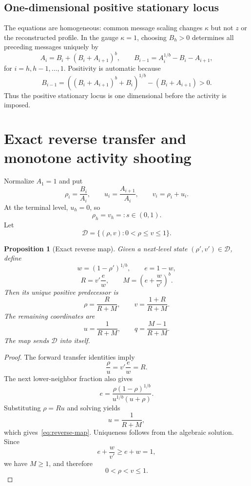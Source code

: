 \documentclass[11pt]{amsart}
\newtheorem{proposition}[theorem]{Proposition}
\theoremstyle{definition}
\newcommand{\Dcal}{\mathcal D}
\begin{document}
\subsection{One-dimensional positive stationary locus}
The equations are homogeneous: common message scaling changes $\kappa$ but not $z$ or the reconstructed profile.  In the gauge $\kappa=1$, choosing $B_h>0$ determines all preceding messages uniquely by
\begin{equation}\label{eq:message-backward}
 A_i=B_i+(B_i+A_{i+1})^b,
 \qquad
 B_{i-1}=A_i^{1/b}-B_i-A_{i+1},
\end{equation}
for $i=h,h-1,\ldots,1$.  Positivity is automatic because
\[
 B_{i-1}=\left((B_i+A_{i+1})^b+B_i\right)^{1/b}-(B_i+A_{i+1})>0.
\]
Thus the positive stationary locus is one dimensional before the activity is imposed.


\section{Exact reverse transfer and monotone activity shooting}
Normalize $A_1=1$ and put
\[
 \rho_i=\frac{B_i}{A_i},
 \qquad
 u_i=\frac{A_{i+1}}{A_i},
 \qquad
 v_i=\rho_i+u_i.
\]
At the terminal level, $u_h=0$, so
\[
 \rho_h=v_h=:s\in(0,1).
\]
Let
\[
 \Dcal=\{(\rho,v):0<\rho\le v\le1\}.
\]

\begin{proposition}[Exact reverse map]\label{prop:reverse-map}
Given a next-level state $(\rho',v')\in\Dcal$, define
\[
 w=(1-\rho')^{1/b},
 \qquad
 e=1-w,
\]
\[
 R=v'\frac ew,
 \qquad
 M=\left(e+\frac w{v'}\right)^b.
\]
Then its unique positive predecessor is
\begin{equation}\label{eq:reverse-map}
 \boxed{
 \rho=\frac{R}{R+M},
 \qquad
 v=\frac{1+R}{R+M}.
 }
\end{equation}
The remaining coordinates are
\begin{equation}\label{eq:reverse-out}
 u=\frac1{R+M},\qquad q=\frac{M-1}{R+M}.
\end{equation}
The map sends $\Dcal$ into itself.
\end{proposition}

\begin{proof}
The forward transfer identities imply
\[
 \frac\rho u=v'\frac ew=R.
\]
The next lower-neighbor fraction also gives
\[
 e=\frac{\rho(1-\rho)^{1/b}}
 {u^{1/b}(u+\rho)}.
\]
Substituting $\rho=Ru$ and solving yields
\[
 u=\frac1{R+M},
\]
which gives~\eqref{eq:reverse-map}.  Uniqueness follows from the algebraic solution.  Since
\[
 e+\frac w{v'}\ge e+w=1,
\]
we have $M\ge1$, and therefore
\[
 0<\rho<v\le1.
\]
\end{proof}
\end{document}
